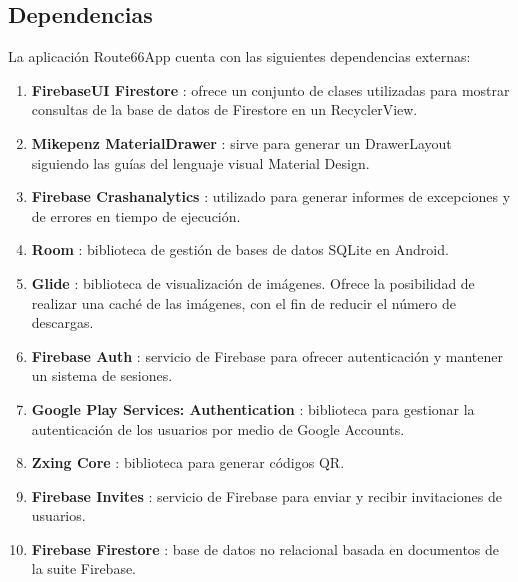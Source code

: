 \documentclass[twoside]{report}
\begin{document}
\subsection{Dependencias}

La aplicación Route66App cuenta con las siguientes dependencias externas:
\begin{enumerate}
\item \textbf{FirebaseUI Firestore} \cite{firebaseuifirestore}: ofrece un conjunto de clases utilizadas para mostrar consultas de la base de datos de Firestore en un RecyclerView.

\item  \textbf{Mikepenz MaterialDrawer} \cite{mikepenzmaterialdrawer}: sirve para generar un DrawerLayout siguiendo las guías del lenguaje visual Material Design.

\item \textbf{Firebase Crashanalytics} \cite{crashanalyticsfb}: utilizado para generar informes de excepciones y de errores en tiempo de ejecución.

\item \textbf{Room} \cite{roomdependencies}: biblioteca de gestión de bases de datos SQLite en Android.

\item \textbf{Glide} \cite{glidedependencies}: biblioteca de visualización de imágenes. Ofrece la posibilidad de realizar una caché de las imágenes, con el fin de reducir el número de descargas.

\item \textbf{Firebase Auth} \cite{firebaseauthdependencies}: servicio de Firebase para ofrecer autenticación y mantener un sistema de sesiones.

\item \textbf{Google Play Services: Authentication} \cite{googleservicesauthdependencies}: biblioteca para gestionar la autenticación de los usuarios por medio de Google Accounts.

\item \textbf{Zxing Core} \cite{zxingdependencies}: biblioteca para generar códigos QR.

\item \textbf{Firebase Invites} \cite{finvitesdependencies}: servicio de Firebase para enviar y recibir invitaciones de usuarios.

\item \textbf{Firebase Firestore} \cite{ffirestoredependencies}: base de datos no relacional basada en documentos de la suite Firebase.


\end{enumerate}
\end{document}
